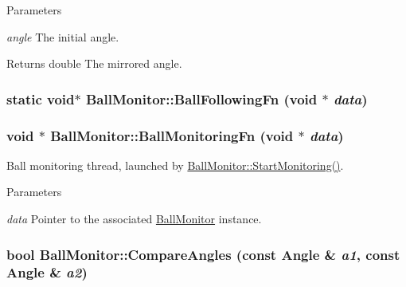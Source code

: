 \begin{DoxyParams}{Parameters}
\item[{\em angle}]The initial angle. \end{DoxyParams}
\begin{DoxyReturn}{Returns}
double The mirrored angle. 
\end{DoxyReturn}
\hypertarget{classBallMonitor_a2ca3e25f437b5aabb3bc88e0f84cf9a5}{
\subsubsection[{BallFollowingFn}]{\setlength{\rightskip}{0pt plus 5cm}static void$\ast$ BallMonitor::BallFollowingFn (void $\ast$ {\em data})}}
\label{classBallMonitor_a2ca3e25f437b5aabb3bc88e0f84cf9a5}
\hypertarget{classBallMonitor_af76da8bc13e92d9083a9a77469c472df}{
\subsubsection[{BallMonitoringFn}]{\setlength{\rightskip}{0pt plus 5cm}void $\ast$ BallMonitor::BallMonitoringFn (void $\ast$ {\em data})}}
\label{classBallMonitor_af76da8bc13e92d9083a9a77469c472df}


Ball monitoring thread, launched by \hyperlink{classBallMonitor_a4d2b3aa764f5d4f4d5f58b7530565f90}{BallMonitor::StartMonitoring()}. 


\begin{DoxyParams}{Parameters}
\item[{\em data}]Pointer to the associated \hyperlink{classBallMonitor}{BallMonitor} instance. \end{DoxyParams}
\hypertarget{classBallMonitor_a78114ec7fc20317f84491e428dd8c126}{
\subsubsection[{CompareAngles}]{\setlength{\rightskip}{0pt plus 5cm}bool BallMonitor::CompareAngles (const {\bf Angle} \& {\em a1}, \/  const {\bf Angle} \& {\em a2})}}
\label{classBallMonitor_a78114ec7fc20317f84491e428dd8c126}


